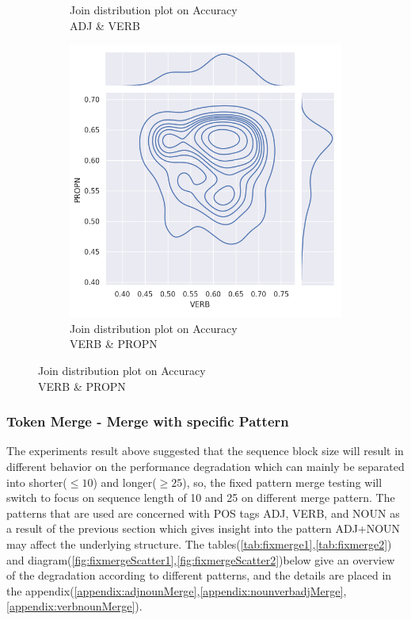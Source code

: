 \documentclass[12pt]{article}
\begin{document}
\begin{figure} [!h]
\begin{subfigure}[h]{0.3\linewidth}
\caption{Join distribution plot on Accuracy\\ADJ \& VERB}
\end{subfigure}
\hfill
\begin{subfigure}[h]{0.3\linewidth}
\includegraphics[width=\linewidth]{figures/merge_verb_propn_joinplot.png}
\caption{Join distribution plot on Accuracy\\VERB \& PROPN}
\label{fig:displot1}
\end{subfigure}
\end{figure}

\subsubsection{Token Merge - Merge with specific Pattern }
The experiments result above suggested that the sequence block size will result in different behavior on the performance degradation which can mainly be separated into shorter($\leq10$) and longer($\geq25$), so, the fixed pattern merge testing will switch to focus on sequence length of 10 and 25 on different merge pattern. The patterns that are used are concerned with POS tags ADJ, VERB, and NOUN as a result of the previous section which gives insight into the pattern ADJ+NOUN may affect the underlying structure. The tables(\ref{tab:fixmerge1},\ref{tab:fixmerge2}) and diagram(\ref{fig:fixmergeScatter1},\ref{fig:fixmergeScatter2})below give an overview of the degradation according to different patterns, and the details are placed in the appendix(\ref{appendix:adjnounMerge},\ref{appendix:nounverbadjMerge},\ref{appendix:verbnounMerge}).
\end{document}
